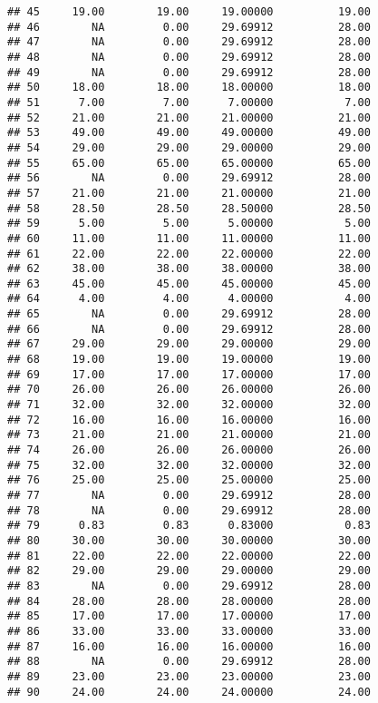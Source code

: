 \documentclass[
]{article}
\begin{document}
\begin{verbatim}
## 45     19.00        19.00     19.00000          19.00
## 46        NA         0.00     29.69912          28.00
## 47        NA         0.00     29.69912          28.00
## 48        NA         0.00     29.69912          28.00
## 49        NA         0.00     29.69912          28.00
## 50     18.00        18.00     18.00000          18.00
## 51      7.00         7.00      7.00000           7.00
## 52     21.00        21.00     21.00000          21.00
## 53     49.00        49.00     49.00000          49.00
## 54     29.00        29.00     29.00000          29.00
## 55     65.00        65.00     65.00000          65.00
## 56        NA         0.00     29.69912          28.00
## 57     21.00        21.00     21.00000          21.00
## 58     28.50        28.50     28.50000          28.50
## 59      5.00         5.00      5.00000           5.00
## 60     11.00        11.00     11.00000          11.00
## 61     22.00        22.00     22.00000          22.00
## 62     38.00        38.00     38.00000          38.00
## 63     45.00        45.00     45.00000          45.00
## 64      4.00         4.00      4.00000           4.00
## 65        NA         0.00     29.69912          28.00
## 66        NA         0.00     29.69912          28.00
## 67     29.00        29.00     29.00000          29.00
## 68     19.00        19.00     19.00000          19.00
## 69     17.00        17.00     17.00000          17.00
## 70     26.00        26.00     26.00000          26.00
## 71     32.00        32.00     32.00000          32.00
## 72     16.00        16.00     16.00000          16.00
## 73     21.00        21.00     21.00000          21.00
## 74     26.00        26.00     26.00000          26.00
## 75     32.00        32.00     32.00000          32.00
## 76     25.00        25.00     25.00000          25.00
## 77        NA         0.00     29.69912          28.00
## 78        NA         0.00     29.69912          28.00
## 79      0.83         0.83      0.83000           0.83
## 80     30.00        30.00     30.00000          30.00
## 81     22.00        22.00     22.00000          22.00
## 82     29.00        29.00     29.00000          29.00
## 83        NA         0.00     29.69912          28.00
## 84     28.00        28.00     28.00000          28.00
## 85     17.00        17.00     17.00000          17.00
## 86     33.00        33.00     33.00000          33.00
## 87     16.00        16.00     16.00000          16.00
## 88        NA         0.00     29.69912          28.00
## 89     23.00        23.00     23.00000          23.00
## 90     24.00        24.00     24.00000          24.00

\end{verbatim}
\end{document}
